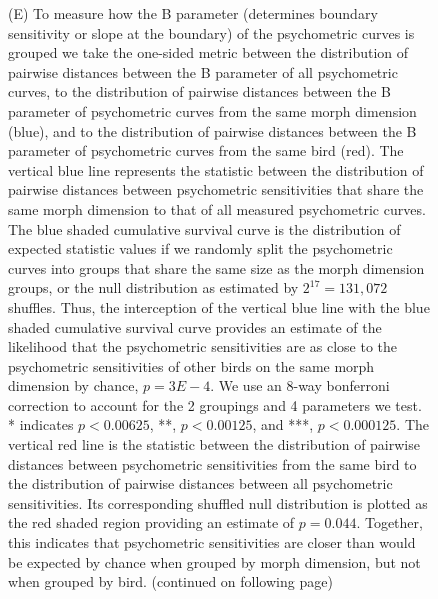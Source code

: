 \begin{figure}[tp]
{(E)	To measure how the B parameter (determines boundary sensitivity or slope at the boundary) of the psychometric curves is grouped we take the one-sided \KS metric between the distribution of pairwise distances between the B parameter of all psychometric curves, to the distribution of pairwise distances between the B parameter of psychometric curves from the same morph dimension (blue), and to the distribution of pairwise distances between the B parameter of psychometric curves from the same bird (red). The vertical blue line represents the \KS statistic between the distribution of pairwise distances between psychometric sensitivities that share the same morph dimension to that of all measured psychometric curves. The blue shaded cumulative survival curve is the distribution of expected \KS statistic values if we randomly split the psychometric curves into groups that share the same size as the morph dimension groups, or the null distribution as estimated by $2^{17}=131,072$ shuffles. Thus, the interception of the vertical blue line with the blue shaded cumulative survival curve provides an estimate of the likelihood that the psychometric sensitivities are as close to the psychometric sensitivities of other birds on the same morph dimension by chance, $p=3E-4$. We use an 8-way bonferroni correction to account for the 2 groupings and 4 parameters we test. * indicates $p<0.00625$, **, $p<0.00125$, and ***, $p<0.000125$. The vertical red line is the \KS statistic between the distribution of pairwise distances between psychometric sensitivities from the same bird to the distribution of pairwise distances between all psychometric sensitivities. Its corresponding shuffled null distribution is plotted as the red shaded region providing an estimate of $p=0.044$. Together, this indicates that psychometric sensitivities are closer than would be expected by chance when grouped by morph dimension, but not when grouped by bird. (continued on following page)
}
\end{figure}

\begin{figure}[tp]
\end{figure}